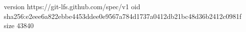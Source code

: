version https://git-lfs.github.com/spec/v1
oid sha256:e2eee6a822ebbe4453ddee0e9567a784d1737a0412db21bc48d36b2412c0981f
size 43840

